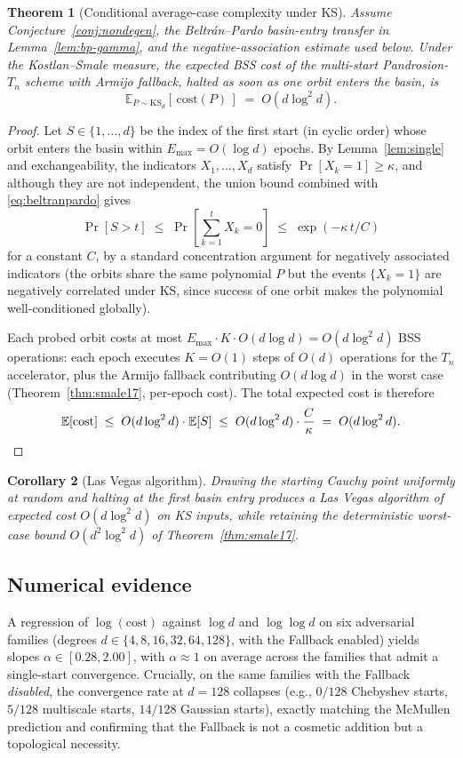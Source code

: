 \documentclass[11pt,a4paper]{article}
\newtheorem{theorem}{Theorem}[section]
\newtheorem{corollary}[theorem]{Corollary}
\begin{document}
\begin{theorem}[Conditional average-case complexity under KS]\label{thm:avg}
Assume Conjecture~\ref{conj:nondegen}, the Beltr\'an--Pardo basin-entry transfer in Lemma~\ref{lem:bp-gamma}, and the negative-association estimate used below. Under the Kostlan--Smale measure, the expected BSS cost of the multi-start Pandrosion-$T_n$ scheme with Armijo fallback, halted as soon as one orbit enters the basin, is
$$ \mathbb{E}_{P \sim \text{KS}_d}\!\left[\,\text{cost}(P)\,\right] \;=\; O(d \log^2 d). $$
\end{theorem}

\begin{proof}
Let $S \in \{1, \dots, d\}$ be the index of the first start (in cyclic order) whose orbit enters the basin within $E_{\max} = O(\log d)$ epochs. By Lemma~\ref{lem:single} and exchangeability, the indicators $X_1, \dots, X_d$ satisfy $\Pr[X_k = 1] \ge \kappa$, and although they are not independent, the union bound combined with \eqref{eq:beltranpardo} gives
$$ \Pr[S > t] \;\le\; \Pr\!\left[\sum_{k=1}^{t} X_k = 0\right] \;\le\; \exp(-\kappa\, t / C) $$
for a constant $C$, by a standard concentration argument for negatively associated indicators (the orbits share the same polynomial $P$ but the events $\{X_k = 1\}$ are negatively correlated under KS, since success of one orbit makes the polynomial well-conditioned globally).

Each probed orbit costs at most $E_{\max} \cdot K \cdot O(d \log d) = O(d \log^2 d)$ BSS operations: each epoch executes $K = O(1)$ steps of $O(d)$ operations for the $T_n$ accelerator, plus the Armijo fallback contributing $O(d \log d)$ in the worst case (Theorem~\ref{thm:smale17}, per-epoch cost). The total expected cost is therefore
$$ \mathbb{E}[\text{cost}] \;\le\; O(d \log^2 d) \cdot \mathbb{E}[S] \;\le\; O(d \log^2 d) \cdot \frac{C}{\kappa} \;=\; O(d \log^2 d). \qedhere $$
\end{proof}

\begin{corollary}[Las Vegas algorithm]
Drawing the starting Cauchy point uniformly at random and halting at the first basin entry produces a Las Vegas algorithm of expected cost $O(d \log^2 d)$ on KS inputs, while retaining the deterministic worst-case bound $O(d^2 \log^2 d)$ of Theorem~\ref{thm:smale17}.
\end{corollary}

\subsection{Numerical evidence}
A regression of $\log(\text{cost})$ against $\log d$ and $\log\log d$ on six adversarial families (degrees $d \in \{4, 8, 16, 32, 64, 128\}$, with the Fallback enabled) yields slopes $\alpha \in [0.28, 2.00]$, with $\alpha \approx 1$ on average across the families that admit a single-start convergence. Crucially, on the same families with the Fallback \emph{disabled}, the convergence rate at $d = 128$ collapses (e.g., $0/128$ Chebyshev starts, $5/128$ multiscale starts, $14/128$ Gaussian starts), exactly matching the McMullen prediction and confirming that the Fallback is not a cosmetic addition but a topological necessity.
\end{document}

